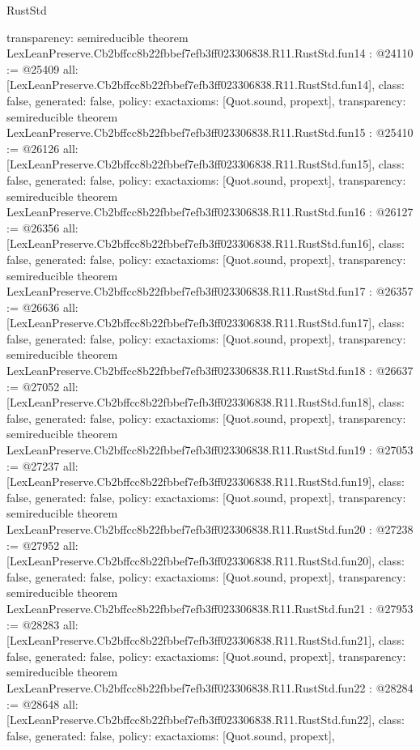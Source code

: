 \begin{lexlean}{RustStd}
\begin{coremodule}
{  transparency: semireducible
}
theorem LexLeanPreserve.Cb2bffcc8b22fbbef7efb3ff023306838.R11.RustStd.fun14 : @24110 := @25409 {
  all: [LexLeanPreserve.Cb2bffcc8b22fbbef7efb3ff023306838.R11.RustStd.fun14],
  class: false,
  generated: false,
  policy: exact{axioms: [Quot.sound, propext]},
  transparency: semireducible
}
theorem LexLeanPreserve.Cb2bffcc8b22fbbef7efb3ff023306838.R11.RustStd.fun15 : @25410 := @26126 {
  all: [LexLeanPreserve.Cb2bffcc8b22fbbef7efb3ff023306838.R11.RustStd.fun15],
  class: false,
  generated: false,
  policy: exact{axioms: [Quot.sound, propext]},
  transparency: semireducible
}
theorem LexLeanPreserve.Cb2bffcc8b22fbbef7efb3ff023306838.R11.RustStd.fun16 : @26127 := @26356 {
  all: [LexLeanPreserve.Cb2bffcc8b22fbbef7efb3ff023306838.R11.RustStd.fun16],
  class: false,
  generated: false,
  policy: exact{axioms: [Quot.sound, propext]},
  transparency: semireducible
}
theorem LexLeanPreserve.Cb2bffcc8b22fbbef7efb3ff023306838.R11.RustStd.fun17 : @26357 := @26636 {
  all: [LexLeanPreserve.Cb2bffcc8b22fbbef7efb3ff023306838.R11.RustStd.fun17],
  class: false,
  generated: false,
  policy: exact{axioms: [Quot.sound, propext]},
  transparency: semireducible
}
theorem LexLeanPreserve.Cb2bffcc8b22fbbef7efb3ff023306838.R11.RustStd.fun18 : @26637 := @27052 {
  all: [LexLeanPreserve.Cb2bffcc8b22fbbef7efb3ff023306838.R11.RustStd.fun18],
  class: false,
  generated: false,
  policy: exact{axioms: [Quot.sound, propext]},
  transparency: semireducible
}
theorem LexLeanPreserve.Cb2bffcc8b22fbbef7efb3ff023306838.R11.RustStd.fun19 : @27053 := @27237 {
  all: [LexLeanPreserve.Cb2bffcc8b22fbbef7efb3ff023306838.R11.RustStd.fun19],
  class: false,
  generated: false,
  policy: exact{axioms: [Quot.sound, propext]},
  transparency: semireducible
}
theorem LexLeanPreserve.Cb2bffcc8b22fbbef7efb3ff023306838.R11.RustStd.fun20 : @27238 := @27952 {
  all: [LexLeanPreserve.Cb2bffcc8b22fbbef7efb3ff023306838.R11.RustStd.fun20],
  class: false,
  generated: false,
  policy: exact{axioms: [Quot.sound, propext]},
  transparency: semireducible
}
theorem LexLeanPreserve.Cb2bffcc8b22fbbef7efb3ff023306838.R11.RustStd.fun21 : @27953 := @28283 {
  all: [LexLeanPreserve.Cb2bffcc8b22fbbef7efb3ff023306838.R11.RustStd.fun21],
  class: false,
  generated: false,
  policy: exact{axioms: [Quot.sound, propext]},
  transparency: semireducible
}
theorem LexLeanPreserve.Cb2bffcc8b22fbbef7efb3ff023306838.R11.RustStd.fun22 : @28284 := @28648 {
  all: [LexLeanPreserve.Cb2bffcc8b22fbbef7efb3ff023306838.R11.RustStd.fun22],
  class: false,
  generated: false,
  policy: exact{axioms: [Quot.sound, propext]},
}
\end{coremodule}
\end{lexlean}
